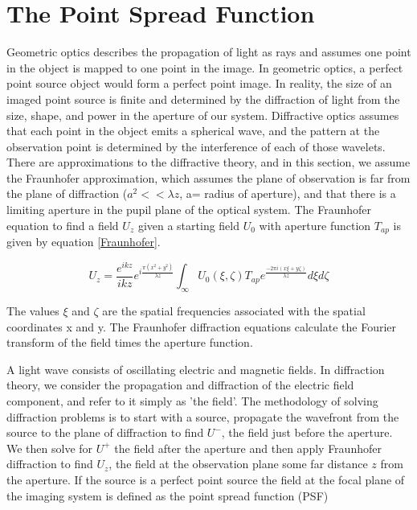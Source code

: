 \section{The Point Spread Function}

 Geometric optics describes the propagation of light as rays and assumes one point in the object is mapped to one point in the image. In geometric optics, a perfect point source object would form a perfect point image. In reality, the size of an imaged point source is finite and determined by the diffraction of light from the size, shape, and power in the aperture of our system. Diffractive optics assumes that each point in the object emits a spherical wave, and the pattern at the observation point is determined by the interference of each of those wavelets. There are approximations to the diffractive theory, and in this section, we assume the Fraunhofer approximation, which assumes the plane of observation is far from the plane of diffraction ($a^2 << \lambda z$, a= radius of aperture), and that there is a limiting aperture in the pupil plane of the optical system. The Fraunhofer equation to find a field $U_z$ given a starting field $U_0$ with aperture function $T_{ap}$ is given by equation \ref{Fraunhofer}.

\begin{equation}
U_z=\frac{e^{ikz}}{ikz}e^{i\frac{\pi (x^2+y^2)}{\lambda z}}\int_{\infty} U_0(\xi,\zeta)T_{ap}e^{\frac{-2\pi i(x\xi+y\zeta)}{\lambda z}}d\xi d\zeta
\label{Fraunhofer}
\end{equation}

The values $\xi$ and $\zeta$ are the spatial frequencies associated with the spatial coordinates x and y. The Fraunhofer diffraction equations calculate the Fourier transform of the field times the aperture function.

A light wave consists of oscillating electric and magnetic fields. In diffraction theory, we consider the propagation and diffraction of the electric field component, and refer to it simply as 'the field'. The methodology of solving diffraction problems is to start with a source, propagate the wavefront from the source to the plane of diffraction to find $U^-$, the field just before the aperture. We then solve for $U^+$ the field after the aperture and then apply Fraunhofer diffraction to find $U_z$, the field at the observation plane some far distance $z$ from the aperture. If the source is a perfect point source the field at the focal plane of the imaging system is defined as the point spread function (PSF)

